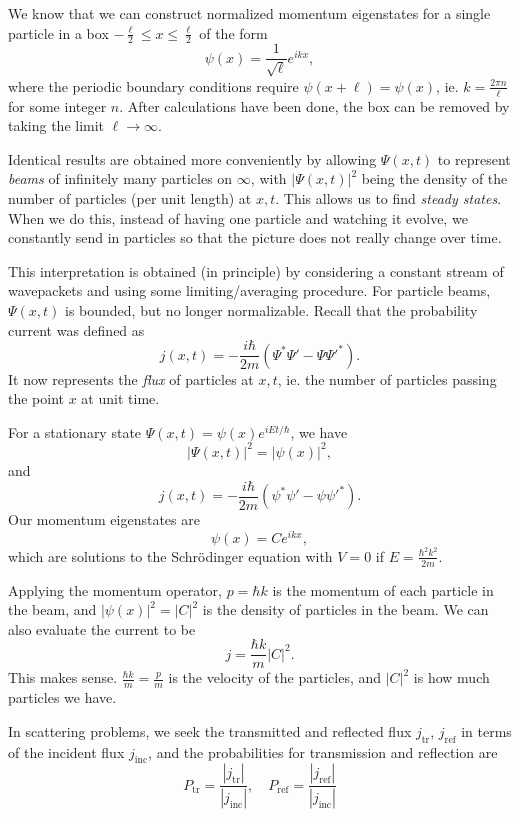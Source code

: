 \documentclass[a4paper]{article}
\begin{document}
We know that we can construct normalized momentum eigenstates for a single particle in a box $-\frac{\ell}{2} \leq x \leq \frac{\ell}{2}$ of the form
\[
  \psi(x) = \frac{1}{\sqrt{\ell}} e^{ikx},
\]
where the periodic boundary conditions require $\psi(x + \ell) = \psi(x)$, ie. $k = \frac{2\pi n}{\ell}$ for some integer $n$. After calculations have been done, the box can be removed by taking the limit $\ell \to \infty$.

Identical results are obtained more conveniently by allowing $\Psi(x, t)$ to represent \emph{beams} of infinitely many particles on $\infty$, with $|\Psi(x, t)|^2$ being the density of the number of particles (per unit length) at $x, t$. This allows us to find \emph{steady states}. When we do this, instead of having one particle and watching it evolve, we constantly send in particles so that the picture does not really change over time.

This interpretation is obtained (in principle) by considering a constant stream of wavepackets and using some limiting/averaging procedure. For particle beams, $\Psi(x, t)$ is bounded, but no longer normalizable. Recall that the probability current was defined as
\[
  j(x, t) = -\frac{i\hbar}{2m}(\Psi^* \Psi' - \Psi \Psi'^*).
\]
It now represents the \emph{flux} of particles at $x, t$, ie. the number of particles passing the point $x$ at unit time.

For a stationary state $\Psi(x, t) = \psi(x) e^{iEt/\hbar}$, we have
\[
  |\Psi(x, t)|^2 = |\psi(x)|^2,
\]
and
\[
  j(x, t) = -\frac{i\hbar}{2m}(\psi^* \psi' - \psi\psi'^*).
\]
Our momentum eigenstates are
\[
  \psi(x) = Ce^{ikx},
\]
which are solutions to the Schr\"odinger equation with $V = 0$ if $E = \frac{\hbar^2 k^2}{2m}$.

Applying the momentum operator, $p = \hbar k$ is the momentum of each particle in the beam, and $|\psi(x)|^2 = |C|^2$ is the density of particles in the beam. We can also evaluate the current to be
\[
  j = \frac{\hbar k}{m}|C|^2.
\]
This makes sense. $\frac{\hbar k}{m} = \frac{p}{m}$ is the velocity of the particles, and $|C|^2$ is how much particles we have.

In scattering problems, we seek the transmitted and reflected flux $j_{\mathrm{tr}}$, $j_{\mathrm{ref}}$ in terms of the incident flux $j_{\mathrm{inc}}$, and the probabilities for transmission and reflection are
\[
  P_{\mathrm{tr}} = \frac{|j_{\mathrm{tr}}|}{|j_{\mathrm{inc}}|},\quad P_{\mathrm{ref}} = \frac{|j_{\mathrm{ref}}|}{|j_{\mathrm{inc}}|}
\]
\end{document}
